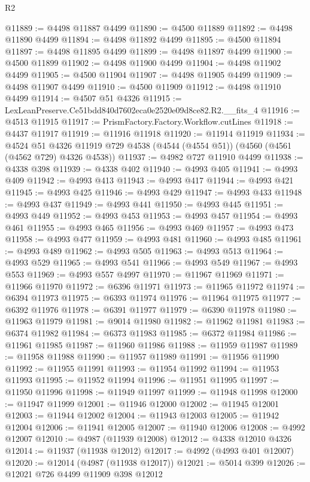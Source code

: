 \begin{lexlean}{R2}
\begin{coremodule}
@11889 := @4498 @11887 @4499
@11890 := @4500 @11889
@11892 := @4498 @11890 @4499
@11894 := @4498 @11892 @4499
@11895 := @4500 @11894
@11897 := @4498 @11895 @4499
@11899 := @4498 @11897 @4499
@11900 := @4500 @11899
@11902 := @4498 @11900 @4499
@11904 := @4498 @11902 @4499
@11905 := @4500 @11904
@11907 := @4498 @11905 @4499
@11909 := @4498 @11907 @4499
@11910 := @4500 @11909
@11912 := @4498 @11910 @4499
@11914 := @4507 @51 @4326
@11915 := LexLeanPreserve.Ce51bdd840d7602eca0e2520e09d8ce82.R2.__fits_4
@11916 := @4513 @11915
@11917 := PrismFactory.Factory.Workflow.cutLines
@11918 := @4437 @11917
@11919 := @11916 @11918
@11920 := @11914 @11919
@11934 := @4524
    @51
    @4326
    @11919
    @729
    @4538
    (@4544 (@4554 @51))
    (@4560 (@4561 (@4562 @729) @4326 @4538))
@11937 := @4982 @727 @11910 @4499
@11938 := @4338 @398
@11939 := @4338 @402
@11940 := @4993 @405
@11941 := @4993 @409
@11942 := @4993 @413
@11943 := @4993 @417
@11944 := @4993 @421
@11945 := @4993 @425
@11946 := @4993 @429
@11947 := @4993 @433
@11948 := @4993 @437
@11949 := @4993 @441
@11950 := @4993 @445
@11951 := @4993 @449
@11952 := @4993 @453
@11953 := @4993 @457
@11954 := @4993 @461
@11955 := @4993 @465
@11956 := @4993 @469
@11957 := @4993 @473
@11958 := @4993 @477
@11959 := @4993 @481
@11960 := @4993 @485
@11961 := @4993 @489
@11962 := @4993 @505
@11963 := @4993 @513
@11964 := @4993 @529
@11965 := @4993 @541
@11966 := @4993 @549
@11967 := @4993 @553
@11969 := @4993 @557 @4997
@11970 := @11967 @11969
@11971 := @11966 @11970
@11972 := @6396 @11971
@11973 := @11965 @11972
@11974 := @6394 @11973
@11975 := @6393 @11974
@11976 := @11964 @11975
@11977 := @6392 @11976
@11978 := @6391 @11977
@11979 := @6390 @11978
@11980 := @11963 @11979
@11981 := @9014 @11980
@11982 := @11962 @11981
@11983 := @6374 @11982
@11984 := @6373 @11983
@11985 := @6372 @11984
@11986 := @11961 @11985
@11987 := @11960 @11986
@11988 := @11959 @11987
@11989 := @11958 @11988
@11990 := @11957 @11989
@11991 := @11956 @11990
@11992 := @11955 @11991
@11993 := @11954 @11992
@11994 := @11953 @11993
@11995 := @11952 @11994
@11996 := @11951 @11995
@11997 := @11950 @11996
@11998 := @11949 @11997
@11999 := @11948 @11998
@12000 := @11947 @11999
@12001 := @11946 @12000
@12002 := @11945 @12001
@12003 := @11944 @12002
@12004 := @11943 @12003
@12005 := @11942 @12004
@12006 := @11941 @12005
@12007 := @11940 @12006
@12008 := @4992 @12007
@12010 := @4987 (@11939 @12008)
@12012 := @4338 @12010 @4326
@12014 := @11937 (@11938 @12012)
@12017 := @4992 (@4993 @401 @12007)
@12020 := @12014 (@4987 (@11938 @12017))
@12021 := @5014 @399
@12026 := @12021 @726 @4499 @11909 @398 @12012

\end{coremodule}
\end{lexlean}
